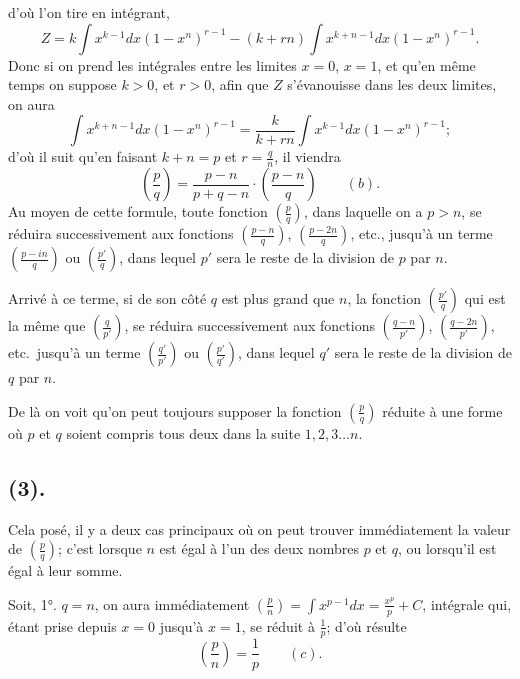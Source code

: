 \documentclass{article}
\begin{document}
d'où l'on tire en intégrant,
\[ Z=k\int x^{k-1}dx(1-x^{n})^{r-1}-(k+rn)\int x^{k+n-1}dx(1-x^{n})^{r-1}. \]
Donc si on prend les intégrales entre les limites $x=0$, $x=1$, et qu'en même temps on suppose $k>0$, et $r>0$, afin que $Z$ s'évanouisse dans les deux limites, on aura
\[ \int x^{k+n-1}dx(1-x^{n})^{r-1}=\frac{k}{k+rn}\int x^{k-1}dx(1-x^{n})^{r-1}; \]
d'où il suit qu'en faisant $k+n=p$ et $r=\frac{q}{n}$, il viendra
\[ \left(\frac{p}{q}\right)=\frac{p-n}{p+q-n}\cdot\left(\frac{p-n}{q}\right)\qquad(b). \]
Au moyen de cette formule, toute fonction $\left(\frac{p}{q}\right)$, dans laquelle on a $p>n$, se réduira successivement aux fonctions $\left(\frac{p-n}{q}\right)$, $\left(\frac{p-2n}{q}\right)$, etc., jusqu'à un terme $\left(\frac{p-in}{q}\right)$ ou $\left(\frac{p'}{q}\right)$, dans lequel $p'$ sera le reste de la division de $p$ par $n$.

Arrivé à ce terme, si de son côté $q$ est plus grand que $n$, la fonction $\left(\frac{p'}{q}\right)$ qui est la même que $\left(\frac{q}{p'}\right)$, se réduira successivement aux fonctions $\left(\frac{q-n}{p'}\right)$, $\left(\frac{q-2n}{p'}\right)$, etc.\ jusqu'à un terme $\left(\frac{q'}{p'}\right)$ ou $\left(\frac{p'}{q'}\right)$, dans lequel $q'$ sera le reste de la division de $q$ par $n$.

De là on voit qu'on peut toujours supposer la fonction $\left(\frac{p}{q}\right)$ réduite à une forme où $p$ et $q$ soient compris tous deux dans la suite $1, 2, 3\ldots n$.

\subsection*{(3).}

Cela posé, il y a deux cas principaux où on peut trouver immédiatement la valeur de $\left(\frac{p}{q}\right)$; c'est lorsque $n$ est égal à l'un des deux nombres $p$ et $q$, ou lorsqu'il est égal à leur somme.

Soit, 1°. $q=n$, on aura immédiatement $\left(\frac{p}{n}\right)=\displaystyle\int x^{p-1}dx=\frac{x^{p}}{p}+C$, intégrale qui, étant prise depuis $x=0$ jusqu'à $x=1$, se réduit à $\frac{1}{p}$; d'où résulte
\[ \left(\frac{p}{n}\right)=\frac{1}{p}\qquad(c). \]

\end{document}
